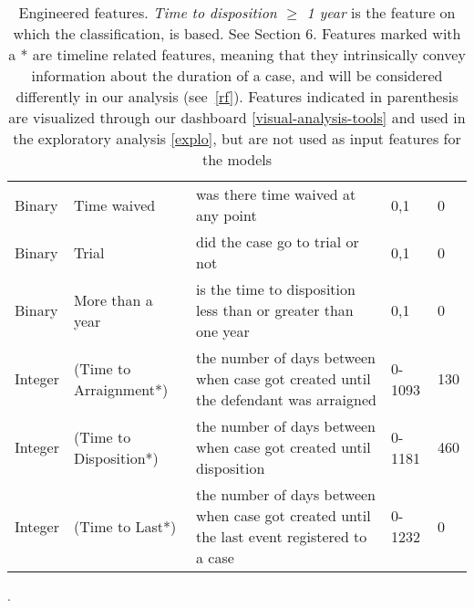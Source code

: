 \begin{table*}
\begin{tabular}{llp{8cm}p{5cm}l}
Binary      & Time waived          & was there time waived at any point                                                                      & 0,1                                                                                                                               & 0              \\
Binary      & Trial                & did the case go to trial or not                                                                         & 0,1                                                                                                                               & 0              \\
Binary      & More than a year     & is the time to disposition less than or greater than one year                                           & 0,1                                                                                                                               & 0              \\
Integer     & (Time to Arraignment*) & the number of days between when case got created until the defendant was arraigned                      & 0-1093                                                                                                                            & 130            \\
Integer     & (Time to Disposition*) & the number of days between when case got created until disposition                                      & 0-1181                                                                                                                            & 460            \\
Integer     & (Time to Last*)       & the number of days between when case got created until the last event registered to a case              & 0-1232                                                                                                                            & 0             
\end{tabular}
\caption{Engineered features. \textit{Time to disposition $\geq$ 1
    year} is the feature on which the classification, is based. See
  Section 6. Features marked with a * are timeline related features,
  meaning that they intrinsically convey information about the
  duration of a case, and will be considered differently in
  our analysis (see~\autoref{rf}). Features indicated in parenthesis
  are visualized through our dashboard \autoref{visual-analysis-tools}
  and used in the exploratory analysis \autoref{explo}, but are not
  used as input features for the
  models}. \label{tab:Features} \end{table*}

